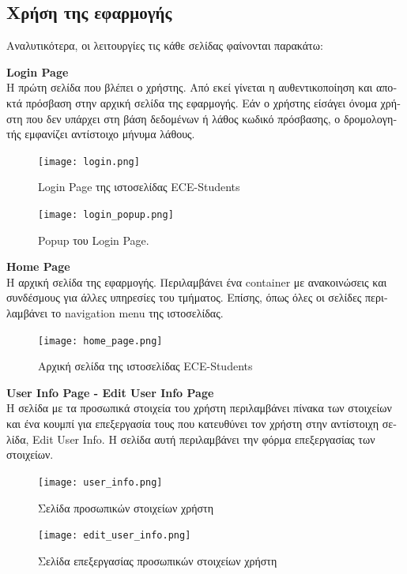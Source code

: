 \documentclass[manuscript,screen,review]{acmart}
\newcommand{\gr}[1]{\foreignlanguage{greek}{#1}}
\begin{document}
\subsection{\gr{Χρήση της εφαρμογής}}
\gr{Αναλυτικότερα, οι λειτουργίες τις κάθε σελίδας φαίνονται παρακάτω:}

\par
\textbf{Login Page}
\\\gr{Η πρώτη σελίδα που βλέπει ο χρήστης. Από εκεί γίνεται η αυθεντικοποίηση και αποκτά πρόσβαση στην αρχική σελίδα της εφαρμογής. Εάν ο χρήστης είσάγει όνομα χρήστη που δεν υπάρχει στη βάση δεδομένων ή λάθος κωδικό πρόσβασης, ο δρομολογητής εμφανίζει αντίστοιχο μήνυμα λάθους.}

\begin{figure}[H]
    \centering
    \texttt{[image: login.png]}
    \caption{Login Page \gr{της ιστοσελίδας} ECE-Students}
    \label{fig:enter-label}
\end{figure}

\begin{figure}[H]
    \centering
    \texttt{[image: login\_popup.png]}
    \caption{Popup \gr{του} Login Page.}
    \label{fig:enter-label}
\end{figure}

\textbf{Home Page}
\\\gr{Η αρχική σελίδα της εφαρμογής. Περιλαμβάνει ένα} container \gr{με ανακοινώσεις και συνδέσμους για άλλες υπηρεσίες του τμήματος. Επίσης, όπως όλες οι σελίδες περιλαμβάνει το} navigation menu \gr{της ιστοσελίδας.}

\begin{figure}[H]
    \centering
    \texttt{[image: home\_page.png]}
    \caption{\gr{Αρχική σελίδα της ιστοσελίδας} ECE-Students}
    \label{fig:enter-label}
\end{figure}

\textbf{User Info Page - Edit User Info Page}
\\\gr{Η σελίδα με τα προσωπικά στοιχεία του χρήστη περιλαμβάνει πίνακα των στοιχείων και ένα κουμπί για επεξεργασία τους που κατευθύνει τον χρήστη στην αντίστοιχη σελίδα,} Edit User Info. \gr{Η σελίδα αυτή περιλαμβάνει την φόρμα επεξεργασίας των στοιχείων.}

\begin{figure}[H]
    \centering
    \texttt{[image: user\_info.png]}
    \caption{\gr{Σελίδα προσωπικών στοιχείων χρήστη}}
    \label{fig:enter-label}
\end{figure}

\begin{figure}[H]
    \centering
    \texttt{[image: edit\_user\_info.png]}
    \caption{\gr{Σελίδα επεξεργασίας προσωπικών στοιχείων χρήστη}}
    \label{fig:enter-label}
\end{figure}
\end{document}
